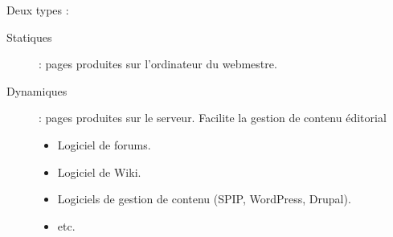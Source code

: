 \begin{slide}
	Deux types : %
	\begin{description}
		\item[Statiques] : pages produites sur l'ordinateur du webmestre.
		\item[Dynamiques] : pages produites sur le serveur. Facilite la gestion de contenu éditorial
		\begin{itemize}
			\item Logiciel de forums.
			\item Logiciel de Wiki.
			\item Logiciels de gestion de contenu (SPIP, WordPress, Drupal).
			\item etc. %
		\end{itemize} 
	\end{description}
\end{slide}
